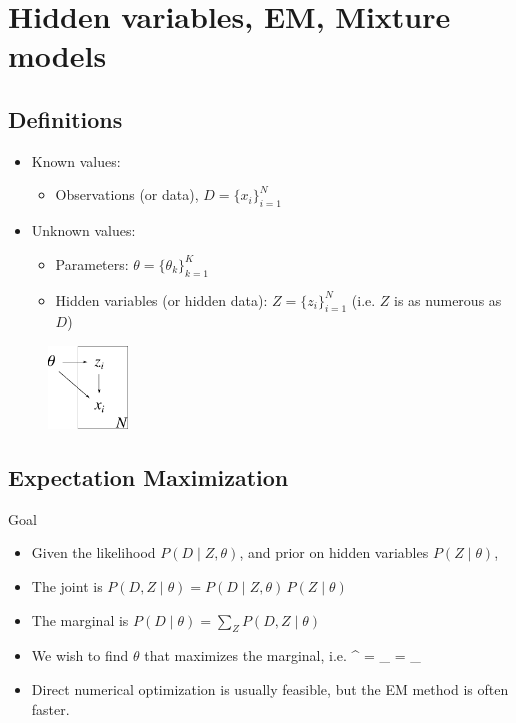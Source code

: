 \newpage
\section{Hidden variables, EM, Mixture models}


\subsection{Definitions}
\begin{itemize}
	\item Known values: 
		\begin{itemize}
			\item Observations (or data), $D = \{x_i\}_{i=1}^N$
		\end{itemize}
	\item Unknown values: 
		\begin{itemize}
			\item Parameters: $\theta = \{\theta_k\}_{k=1}^K$
			\item Hidden variables (or hidden data): $Z = \{z_i\}_{i=1}^N$ (i.e. $Z$ is as numerous as $D$)
		\end{itemize}
\end{itemize}
\begin{figure}[h]
\centering
	\includegraphics[height=22mm]{./figs/05-DZtheta.pdf}
\end{figure}

\subsection{Expectation Maximization}
\no Goal
\begin{itemize}
	\item Given the likelihood $P(D\;|\;Z, \theta)$, and prior on hidden variables $P(Z\;|\;\theta)$,
	\item The joint is $P(D, Z\;|\;\theta) = P(D\;|\;Z, \theta)\, P(Z\;|\;\theta)$
	\item The marginal is $P(D\;|\;\theta) = \sum_Z P(D, Z\;|\;\theta)$
	\item We wish to find $\theta$ that maximizes the marginal, i.e.
	\be
		\theta^ = \amax_{\theta}  = \amax_{\theta} 
	\ee
	\item Direct numerical optimization is usually feasible, but the EM method is often faster.
\end{itemize}


